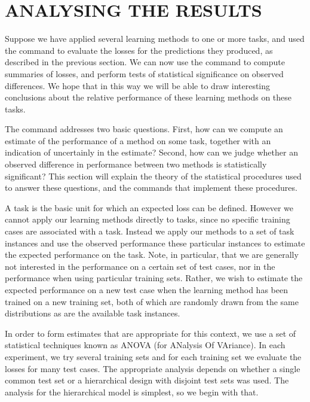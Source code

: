 %
%
\newcommand{\MSa}{{\rm MS}_a}
\newcommand{\MSb}{{\rm MS}_b}
\newcommand{\MSe}{{\rm MS}_\varepsilon}
\renewcommand{\SS}{{\rm SS}}
\newpage

\section{ANALYSING THE RESULTS}\label{sec-analysis}
\thispagestyle{plain}
\setcounter{figure}{0}

Suppose we have applied several learning methods to one or more tasks,
and used the \mloss{} command to evaluate the losses for the
predictions they produced, as described in the previous section.  We
can now use the \mstats{} command to compute summaries of losses, and
perform tests of statistical significance on observed differences.  We
hope that in this way we will be able to draw interesting conclusions
about the relative performance of these learning methods on these
tasks.

The \mstats{} command addresses two basic questions.  First, how can
we compute an estimate of the performance of a method on some task,
together with an indication of uncertainly in the estimate?  Second,
how can we judge whether an observed difference in performance between
two methods is statistically significant?  This section will explain
the theory of the statistical procedures used to answer these
questions, and the commands that implement these procedures.

A task is the basic unit for which an expected loss can be defined.
However we cannot apply our learning methods directly to tasks, since
no specific training cases are associated with a task. Instead we
apply our methods to a set of task instances and use the observed
performance these particular instances to estimate the expected
performance on the task. Note, in particular, that we are generally
not interested in the performance on a certain set of test cases, nor
in the performance when using particular training sets. Rather, we
wish to estimate the expected performance on a new test case when the
learning method has been trained on a new training set, both of which
are randomly drawn from the same distributions as are the available
task instances.

In order to form estimates that are appropriate for this context, we
use a set of statistical techniques known as ANOVA (for ANalysis Of
VAriance).  In each experiment, we try several training sets and for
each training set we evaluate the losses for many test cases. The
appropriate analysis depends on whether a single common test set or a
hierarchical design with disjoint test sets was used.  The analysis
for the hierarchical model is simplest, so we begin with that.

